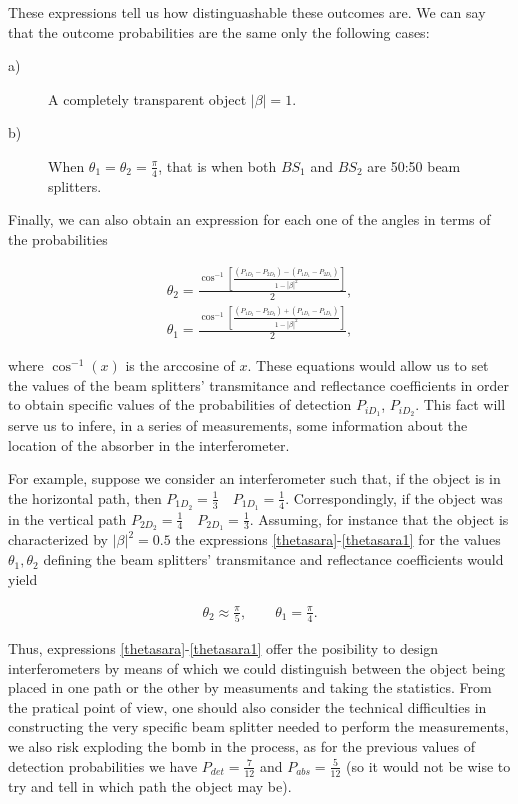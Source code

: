 \documentclass[12pt]{book}
\begin{document}
These expressions tell us how distinguashable these outcomes are.  We can say that the outcome probabilities are the same only the following cases:

\begin{description}

\item[a)] A completely transparent object $|\beta|=1$.

\item[b)] When $\theta_{1}=\theta_{2}=\frac{\pi}{4}$, that is when both $BS_{1}$ and $BS_{2}$ are 50:50 beam splitters.
\end{description}

Finally, we can also obtain an expression for each one of the angles in terms of the probabilities


\begin{align}
\theta_{2}=\displaystyle \frac{\cos^{-1}\left[\frac{(P_{1D_{2}}-P_{2D_{2}})-(P_{1D_{1}}-P_{2D_{1}})}{1-|\beta|^2}\right]}{2},\label{thetasara}\\
\theta_{1}=\displaystyle \frac{\cos^{-1}\left[\frac{(P_{1D_{2}}-P_{2D_{2}})+(P_{1D_{1}}-P_{1D_{1}})}{1-|\beta|^2}\right]}{2}\label{thetasara1},
\end{align}


where $\cos^{-1}(x)$ is the arccosine of $x$. These equations would allow us  to set the values of the beam splitters' transmitance and reflectance coefficients in order to obtain specific values of the probabilities of detection $P_{iD_{1}}$, $P_{iD_{2}}$. This fact will serve us to infere, in a series of measurements, some information about the location of the absorber in the interferometer.  

For example, suppose we consider an interferometer such that, if the object is in the horizontal path, then $P_{1D_{2}}=\frac{1}{3} \quad P_{1D_{1}}=\frac{1}{4}$. Correspondingly,  if the object was in the vertical path $P_{2D_{2}}=\frac{1}{4} \quad P_{2D_{1}}=\frac{1}{3}$. Assuming, for instance that the object is characterized by $|\beta|^{2}=0.5$ the expressions \ref{thetasara}-\ref{thetasara1} for the values $\theta_{1},\theta_{2}$ defining the beam splitters' transmitance and reflectance coefficients would yield

\begin{align*}
\theta_{2} \approx \frac{\pi}{5},\qquad \theta_{1} = \frac{\pi}{4}.
\end{align*}

Thus, expressions \ref{thetasara}-\ref{thetasara1} offer the posibility to design interferometers by means of which we could distinguish between the object being placed in one path or the other by measuments and taking the statistics. From the pratical point of view, one should also consider the technical difficulties in constructing the very specific beam splitter needed to perform the measurements, we also risk exploding the bomb in the process, as for the previous values of detection probabilities we have $P_{det}=\frac{7}{12}$ and $P_{abs}=\frac{5}{12}$ (so it would not be wise to try and tell in which path the object may be).
 
\end{document}

